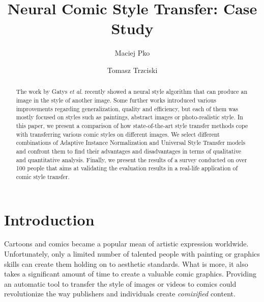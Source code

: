 \documentclass{llncs}
\begin{document}
\title{Neural Comic Style Transfer: Case Study}

\author{Maciej Pko \and Tomasz Trzciski}

\maketitle              %

\begin{abstract}
The work by Gatys \textit{et al}. \cite{gatys:} recently showed a neural style algorithm that can produce an image in the style of another image. Some further works introduced various improvements regarding generalization, quality and efficiency, but each of them was mostly focused on styles such as paintings, abstract images or photo-realistic style. In this paper, we present a comparison of how state-of-the-art style transfer methods cope with transferring various comic styles on different images. We select different combinations of Adaptive Instance Normalization \cite{huang:belongie} and Universal Style Transfer \cite{universal:style} models and confront them to find their advantages and disadvantages in terms of qualitative and quantitative analysis. Finally, we present the results of a survey conducted on over 100 people that aims at validating the evaluation results in a real-life application of comic style transfer.

\end{abstract}

\section{Introduction}
Cartoons and comics became a popular mean of artistic expression worldwide. Unfortunately, only a limited number of talented people with painting or graphics skills can create them holding on to aesthetic standards. What is more, it also takes a significant amount of time to create a valuable comic graphics. Providing an automatic tool to transfer the style of images or videos to comics could revolutionize the way publishers and individuals create {\it comixified} content.%
\end{document}

